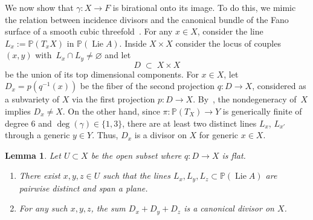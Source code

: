 \documentclass[a4paper]{amsart}
\newcommand{\bbP}{\mathbb{P}}
\DeclareMathOperator{\Lie}{Lie}
\theoremstyle{plain}
\newtheorem{lemma}[theorem]{Lemma}
\theoremstyle{definition}
\numberwithin{equation}{section}
\begin{document}
\medskip

We now show that $\gamma \colon X \to F$ is birational onto its image. To do this, we mimic the relation between incidence divisors and the canonical bundle of the Fano surface of a smooth cubic threefold~\cite[p. 326]{ClemensGriffiths}. For any $x \in X$, consider the line $L_x := \bbP(T_x X)$ in $\bbP(\Lie A)$. Inside $X\times X$ consider the locus of couples~$(x, y)$ with~$L_x\cap L_y \neq \varnothing$ and let
\[ D \; \subset \; X \times X\]
be the union of its top dimensional components.
For $x\in X$, let 
%
$D_x = p(q^{-1}(x))$ be the fiber of the second projection
%
$q\colon D\to X$, considered as a subvariety of $X$ via the first projection $p\colon D\to X$. By~\cite[lemma II.12]{Ran}, the nondegeneracy of~$X$ implies $D_x \neq X$. 
On the other hand, since $\pi\colon \bbP(T_X) \to Y$ is generically finite of degree $6$ and $\deg(\gamma) \in \{ 1, 3 \}$, there are at least two distinct lines $L_x$, $L_{x'}$ through a generic $y \in Y$. Thus, $D_x$ is a divisor on $X$ for generic $x \in X$. 

\begin{lemma} \label{Lemma:FormulaLinesCanonical} \label{Lemma:ExistenceGoodTriples}
Let $U\subset X$ be the open subset where $q\colon D \to X$ is flat.
\begin{enumerate} 
\item There exist $x, y, z \in U$ such that the lines $L_x,L_y,L_z\subset \bbP(\Lie A)$ are pairwise distinct and span a plane.\smallskip
\item For any such $x, y, z$, the sum $D_{x} + D_{y} + D_{z}$ is a canonical divisor on $X$.
\end{enumerate} 
\end{lemma}
\end{document}
